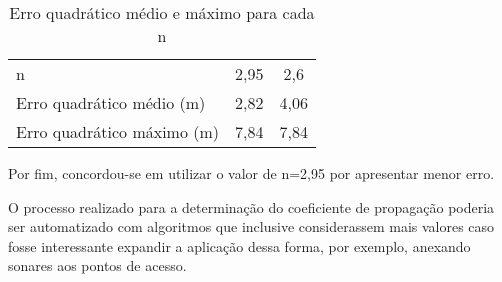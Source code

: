 \begin{table}[ht]
\centering
\caption{Erro quadrático médio e máximo para cada n}
\vspace{0.5cm}
\begin{tabular}{l|cc}
\hline
n & 2,95 & 2,6 \vspace{0.4cm}\\
Erro quadrático médio (m) & 2,82 & 4,06 \vspace{0.4cm}\\
Erro quadrático máximo (m) & 7,84 & 7,84
\end{tabular}
\end{table}

Por fim, concordou-se em utilizar o valor de n=2,95 por apresentar menor erro.

O processo realizado para a determinação do coeficiente de propagação poderia ser automatizado com algoritmos que inclusive considerassem mais valores caso fosse interessante expandir a aplicação dessa forma, por exemplo, anexando sonares aos pontos de acesso.